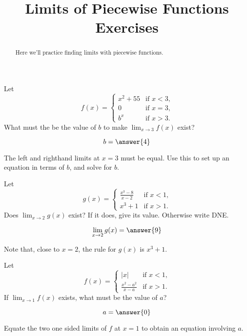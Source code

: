 \documentclass[handout]{ximera}
\title[Exercises:]{Limits of Piecewise Functions Exercises}
\begin{document}
\begin{abstract}
  Here we'll practice finding limits with piecewise functions.
\end{abstract}
\maketitle

\begin{exercise}
Let
\[
f(x) =
\begin{cases} x^2+55 &\text{if $x<3$,}\\
  0 &\text{if $x=3$,} \\
  b^x &\text{if $x>3$.}
\end{cases}
\]  
What must the be the value of $b$ to make $\lim_{x \to 3} f(x)$ exist?
\begin{prompt}
\[
b = \answer{4}
\]
\end{prompt}

\begin{hint}
  The left and righthand limits at $x=3$ must be equal.  Use this to
  set up an equation in terms of $b$, and solve for $b$.
\end{hint}
\end{exercise}

\begin{exercise}
Let
\[
g(x) = \begin{cases}
  \frac{x^3 - 8}{x-2}  &\text{if $x<1$,} \\
  x^3+1 &\text{if  $x>1$.}
\end{cases}
\]
Does $\lim_{x \to 2} g(x)$ exist?  If it does, give its value.
Otherwise write DNE.
\begin{prompt}
\[
\lim_{x \to 2} g(x) = \answer{9}
\]
\end{prompt}
\begin{hint}
	Note that, close to $x=2$, the rule for $g(x)$ is $x^3+1$.
\end{hint}

\end{exercise}


\begin{exercise}
Let
\[
f(x) = \begin{cases}
  |x| &\text{if $x<1$,} \\
  \frac{x^2-a^2}{x-a} &\text{if $x>1$.}
\end{cases}
\]
If $\lim_{x \to 1} f(x)$ exists, what must be the value of $a$?
\begin{prompt}
  \[
a = \answer{0}
\]
\end{prompt}
\begin{hint}
  Equate the two one sided limits of $f$ at $x=1$ to obtain an equation involving $a$.
\end{hint}

\end{exercise}
\end{document}
